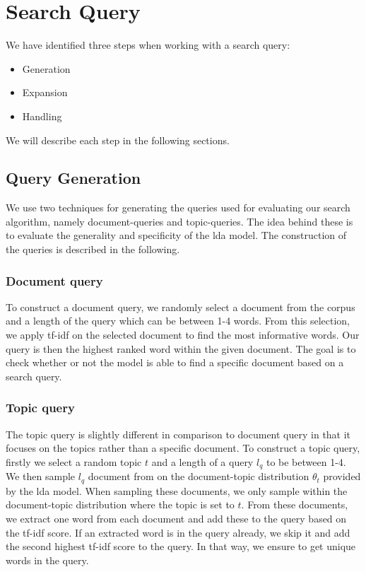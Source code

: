 \section{Search Query}
We have identified three steps when working with a search query:
\begin{itemize}
	\item Generation
	\item Expansion
	\item Handling
\end{itemize}

We will describe each step in the following sections.

\subsection{Query Generation}
We use two techniques for generating the queries used for evaluating our search algorithm, namely document-queries and topic-queries.
The idea behind these is to evaluate the generality and specificity of the \gls{lda} model.
The construction of the queries is described in the following.

\subsubsection{Document query}
To construct a document query, we randomly select a document from the corpus and a length of the query which can be between 1-4 words.
From this selection, we apply \gls{tf-idf} on the selected document to find the most informative words.
Our query is then the highest ranked word within the given document.
The goal is to check whether or not the model is able to find a specific document based on a search query.

\subsubsection{Topic query} 
The topic query is slightly different in comparison to document query in that it focuses on the topics rather than a specific document.
To construct a topic query, firstly we select a random topic $t$ and a length of a query $l_q$ to be between 1-4.
We then sample $l_q$ document from on the document-topic distribution $\theta_t$ provided by the \gls{lda} model. 
When sampling these documents, we only sample within the document-topic distribution where the topic is set to $t$.
From these documents, we extract one word from each document and add these to the query based on the \gls{tf-idf} score.
If an extracted word is in the query already, we skip it and add the second highest \gls{tf-idf} score to the query.
In that way, we ensure to get unique words in the query.


